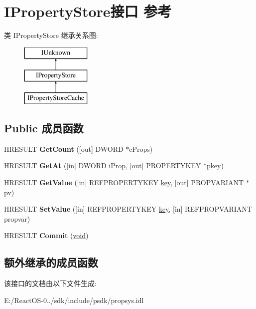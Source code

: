\hypertarget{interface_i_property_store}{}\section{I\+Property\+Store接口 参考}
\label{interface_i_property_store}
类 I\+Property\+Store 继承关系图\+:\begin{figure}[H]
\begin{center}
\leavevmode
\includegraphics[height=3.000000cm]{interface_i_property_store}
\end{center}
\end{figure}
\subsection*{Public 成员函数}
\begin{DoxyCompactItemize}
\item 
\mbox{\label{interface_i_property_store_acf0216b55e1d704f3065b3fc9f133171}} 
H\+R\+E\+S\+U\+LT {\bfseries Get\+Count} (\mbox{[}out\mbox{]} D\+W\+O\+RD $\ast$c\+Props)
\item 
\mbox{\label{interface_i_property_store_a4ffd2be99ed964cf4baff9ebf7eb2be0}} 
H\+R\+E\+S\+U\+LT {\bfseries Get\+At} (\mbox{[}in\mbox{]} D\+W\+O\+RD i\+Prop, \mbox{[}out\mbox{]} P\+R\+O\+P\+E\+R\+T\+Y\+K\+EY $\ast$pkey)
\item 
\mbox{\label{interface_i_property_store_a89254e99d54039032826a68d805a73db}} 
H\+R\+E\+S\+U\+LT {\bfseries Get\+Value} (\mbox{[}in\mbox{]} R\+E\+F\+P\+R\+O\+P\+E\+R\+T\+Y\+K\+EY \hyperlink{structkey}{key}, \mbox{[}out\mbox{]} P\+R\+O\+P\+V\+A\+R\+I\+A\+NT $\ast$pv)
\item 
\mbox{\label{interface_i_property_store_abefbb91d00a6b9e8113696de40c755ae}} 
H\+R\+E\+S\+U\+LT {\bfseries Set\+Value} (\mbox{[}in\mbox{]} R\+E\+F\+P\+R\+O\+P\+E\+R\+T\+Y\+K\+EY \hyperlink{structkey}{key}, \mbox{[}in\mbox{]} R\+E\+F\+P\+R\+O\+P\+V\+A\+R\+I\+A\+NT propvar)
\item 
\mbox{\label{interface_i_property_store_a69b5de0aae42195f8e2cb37559688190}} 
H\+R\+E\+S\+U\+LT {\bfseries Commit} (\hyperlink{interfacevoid}{void})
\end{DoxyCompactItemize}
\subsection*{额外继承的成员函数}


该接口的文档由以下文件生成\+:\begin{DoxyCompactItemize}
\item 
E\+:/\+React\+O\+S-\/0../sdk/include/psdk/propsys.\+idl\end{DoxyCompactItemize}
